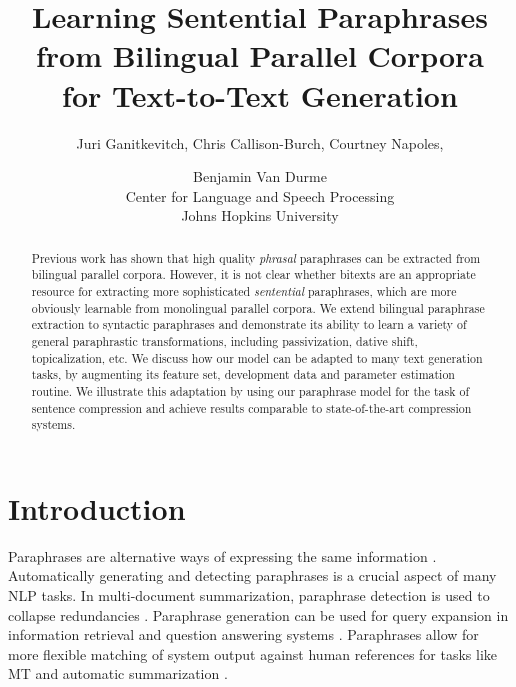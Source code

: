 \documentclass[11pt]{article}
\title{Learning Sentential Paraphrases from Bilingual Parallel Corpora
  \\ for Text-to-Text Generation}
\author{Juri Ganitkevitch, Chris Callison-Burch, Courtney
   Napoles, \and Benjamin Van Durme\\
   Center for Language and Speech Processing\\
   Johns Hopkins University}
\date{}
\begin{document}
\maketitle

\begin{abstract}
  Previous work has shown that high quality {\it phrasal} paraphrases
  can be extracted from bilingual parallel corpora.  However, it is
  not clear whether bitexts are an appropriate resource for extracting
  more sophisticated {\it sentential} paraphrases, which are more
  obviously learnable from monolingual parallel corpora.  We extend
  bilingual paraphrase extraction to syntactic paraphrases and
  demonstrate its ability to learn a variety of general paraphrastic
  transformations, including passivization, dative shift,
  topicalization, etc.  We discuss how our model can be adapted to
  many text generation tasks, by augmenting its feature set,
  development data and parameter estimation routine.  We illustrate
  this adaptation by using our paraphrase model for the task of
  sentence compression and achieve results comparable to
  state-of-the-art compression systems.
\end{abstract}

\section{Introduction} \label{introduction}

Paraphrases are alternative ways of expressing the same information
\cite{Culicover1968}.  Automatically generating and detecting
paraphrases is a crucial aspect of many NLP tasks.  In multi-document
summarization, paraphrase detection is used to collapse redundancies
\cite{Barzilay1999,BarzilayThesis}. Paraphrase generation can be used
for query expansion in information retrieval and question answering
systems
\cite{mckeown:1979:ACL,Anick1999,Ravichandran2002,Riezler2007}.
Paraphrases allow for more flexible matching of system output
against human references for tasks like MT and
automatic summarization
\cite{Zhou2006b,Kauchak2006,Madnani2007,Snover2010}.
\end{document}
